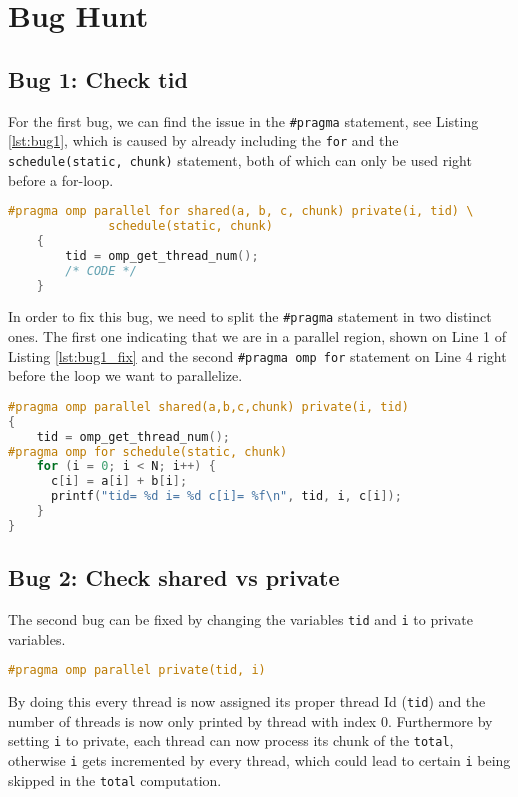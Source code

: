 \section{Bug Hunt}

\subsection{Bug 1: Check tid}
For the first bug, we can find the issue in the \texttt{\#pragma} statement, see Listing \ref{lst:bug1}, which is caused by already including the \texttt{for} and the \texttt{schedule(static, chunk)} statement, both of which can only be used right before a for-loop.
\begin{lstlisting}[language=C++, caption=Bug in bug1.c, label=lst:bug1]
#pragma omp parallel for shared(a, b, c, chunk) private(i, tid) \
              schedule(static, chunk)
	{
		tid = omp_get_thread_num();
		/* CODE */
	}
\end{lstlisting}
In order to fix this bug, we need to split the \texttt{\#pragma} statement in two distinct ones. The first one indicating that we are in a parallel region, shown on Line 1 of Listing \ref{lst:bug1_fix} and the second \texttt{\#pragma omp for} statement on Line 4 right before the loop we want to parallelize.
\begin{lstlisting}[language=C++, caption=Fix for bug1.c, label=lst:bug1_fix]
#pragma omp parallel shared(a,b,c,chunk) private(i, tid)
{
    tid = omp_get_thread_num();
#pragma omp for schedule(static, chunk) 
    for (i = 0; i < N; i++) {
      c[i] = a[i] + b[i];
      printf("tid= %d i= %d c[i]= %f\n", tid, i, c[i]);
    }
}
\end{lstlisting}

\subsection{Bug 2: Check shared vs private}
The second bug can be fixed by changing the variables \texttt{tid} and \texttt{i} to private variables.
\begin{lstlisting}[language=C++, caption=Fix bug2.c, label=lst:bug2_fix]
#pragma omp parallel private(tid, i)
\end{lstlisting}
By doing this every thread is now assigned its proper thread Id (\texttt{tid}) and the number of threads is now only printed by thread with index 0. Furthermore by setting \texttt{i} to private, each thread can now process its chunk of the \texttt{total}, otherwise \texttt{i} gets incremented by every thread, which could lead to certain \texttt{i} being skipped in the \texttt{total} computation.

